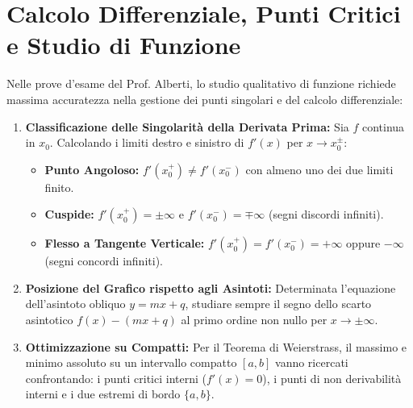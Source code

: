 \section{Calcolo Differenziale, Punti Critici e Studio di Funzione}
\label{sec:esami_studio_funzione}

\begin{esame}
Nelle prove d'esame del Prof. Alberti, lo studio qualitativo di funzione richiede massima accuratezza nella gestione dei punti singolari e del calcolo differenziale:
\begin{enumerate}
    \item \textbf{Classificazione delle Singolarità della Derivata Prima:}
    Sia $f$ continua in $x_0$. Calcolando i limiti destro e sinistro di $f'(x)$ per $x \to x_0^\pm$:
    \begin{itemize}
        \item \textbf{Punto Angoloso:} $f'(x_0^+) \neq f'(x_0^-)$ con almeno uno dei due limiti finito.
        \item \textbf{Cuspide:} $f'(x_0^+) = \pm \infty$ e $f'(x_0^-) = \mp \infty$ (segni discordi infiniti).
        \item \textbf{Flesso a Tangente Verticale:} $f'(x_0^+) = f'(x_0^-) = +\infty$ oppure $-\infty$ (segni concordi infiniti).
    \end{itemize}
    \item \textbf{Posizione del Grafico rispetto agli Asintoti:}
    Determinata l'equazione dell'asintoto obliquo $y = mx + q$, studiare sempre il segno dello scarto asintotico $f(x) - (mx + q)$ al primo ordine non nullo per $x \to \pm \infty$.
    \item \textbf{Ottimizzazione su Compatti:}
    Per il Teorema di Weierstrass, il massimo e minimo assoluto su un intervallo compatto $[a, b]$ vanno ricercati confrontando: i punti critici interni ($f'(x) = 0$), i punti di non derivabilità interni e i due estremi di bordo $\{a, b\}$.
\end{enumerate}
\end{esame}

